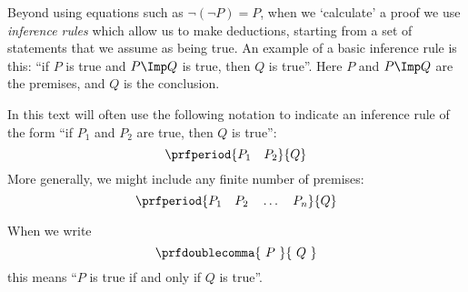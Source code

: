 Beyond using equations such as $\lnot (\lnot P) = P$, when we `calculate' a proof we use \emph{inference rules} which allow us to make deductions, starting from a set of statements that we assume as being true.
An example of a basic inference rule is this: ``if $P$ is true and $P \Imp Q$ is true, then $Q$ is true''.
Here $P$ and $P \Imp Q$ are the premises, and $Q$ is the conclusion.

In this text will often use the following notation to indicate an inference rule of the form ``if $P_1$ and $P_2$ are true, then $Q$ is true'':
\begin{equation}
    \prfperiod{
        P_1 \quad P_2
    }{
        Q
    }
\end{equation}
More generally, we might include any finite number of premises:
\begin{equation}
    \prfperiod{
        P_1 \quad P_2 \quad \dots \quad P_n
    }{
        Q
    }
\end{equation}

When we write
\begin{equation}
    \prfdoublecomma{
        \ P \
    }{
        \ Q \
    }
\end{equation}
this means ``$P$ is true if and only if $Q$ is true''.

